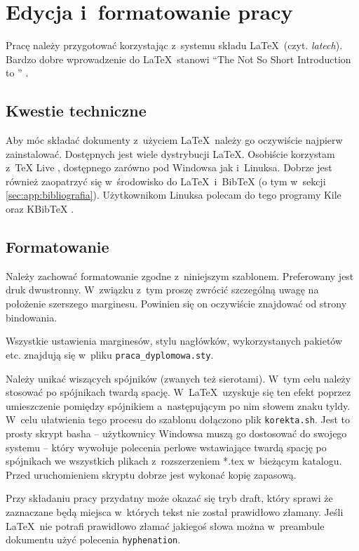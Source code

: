 \chapter{Edycja i~formatowanie pracy}\label{app:edycja}

Pracę należy przygotować korzystając z~systemu składu \LaTeX~(czyt. \textit{latech}). Bardzo dobre wprowadzenie do \LaTeX~stanowi ``The Not So Short Introduction to \LaTeXe'' \cite{Oet11}.

\section{Kwestie techniczne}
Aby móc składać dokumenty z~użyciem \LaTeX~należy go oczywiście najpierw zainstalować. Dostępnych jest wiele dystrybucji \LaTeX. Osobiście korzystam z~TeX Live \cite{texlive}, dostępnego zarówno pod Windowsa jak i~Linuksa. Dobrze jest również zaopatrzyć się w~środowisko do \LaTeX~i~BibTeX (o tym w~sekcji \ref{sec:app:bibliografia}). Użytkownikom Linuksa polecam do tego programy Kile \cite{Kile} oraz KBibTeX \cite{kbibtex}.

\section{Formatowanie}
Należy zachować formatowanie zgodne z~niniejszym szablonem. Preferowany jest druk dwustronny. W~związku z~tym proszę zwrócić szczególną uwagę na położenie szerszego marginesu. Powinien się on oczywiście znajdować od strony bindowania.

Wszystkie ustawienia marginesów, stylu nagłówków, wykorzystanych pakietów etc. znajdują się w~pliku \texttt{praca\_dyplomowa.sty}.

Należy unikać wiszących spójników (zwanych też sierotami). W~tym celu należy stosować po spójnikach twardą spację. W~\LaTeX~uzyskuje się ten efekt poprzez umieszczenie pomiędzy spójnikiem a~następującym po nim słowem znaku tyldy. W~celu ułatwienia tego procesu do szablonu dołączono plik \texttt{korekta.sh}. Jest to prosty skrypt basha -- użytkownicy Windowsa muszą go dostosować do swojego systemu -- który wywołuje polecenia perlowe wstawiające twardą spację po spójnikach we wszystkich plikach z~rozszerzeniem *.tex w~bieżącym katalogu. Przed uruchomieniem skryptu dobrze jest wykonać kopię zapasową.

Przy składaniu pracy przydatny może okazać się tryb draft, który sprawi że zaznaczane będą miejsca w~których tekst nie został prawidłowo złamany. Jeśli \LaTeX~nie potrafi prawidłowo złamać jakiegoś słowa można w~preambule dokumentu użyć polecenia \texttt{hyphenation}.


